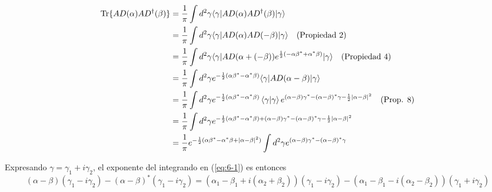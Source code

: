 \begin{enumerate}
        \begin{align}
          \mathrm{Tr}\{ A{D}(\alpha)A{D}^{\dagger}(\beta) \} & = \frac{1}{\pi} \int d^2 \gamma \langle  \gamma \vert A{D}(\alpha) A{D}^{\dagger}(\beta) \vert \gamma \rangle \nonumber                                                                                             \\
                                                                   & = \frac{1}{\pi} \int d^2 \gamma \langle \gamma \vert A{D}(\alpha) A{D}(-\beta) \vert \gamma\rangle \quad (\text{Propiedad 2})\nonumber                                                                              \\
                                                                   & = \frac{1}{\pi} \int d^2 \gamma \langle \gamma \vert A{D}(\alpha + (-\beta))e^{\frac{1}{2}(-\alpha \beta^{*} + \alpha^{*} \beta)} \vert \gamma \rangle \quad (\text{Propiedad 4})\nonumber                             \\
                                                                   & = \frac{1}{\pi} \int d^2 \gamma e^{-\frac{1}{2}(\alpha \beta^* - \alpha^* \beta)} \langle \gamma \vert A{D}(\alpha-\beta)\vert \gamma\rangle  \nonumber                                                                \\
                                                                   & = \frac{1}{\pi} \int d^2 \gamma e^{-\frac{1}{2}(\alpha \beta^* - \alpha^* \beta)} \braket{\gamma}{\gamma} e^{(\alpha-\beta)\gamma^* - (\alpha-\beta)^* \gamma -\frac{1}{2}|\alpha-\beta|^2}\quad\text{(Prop. 8)}\nonumber \\
                                                                   & = \frac{1}{\pi} \int d^2 \gamma e^{ -\frac{1}{2}(\alpha \beta^* - \alpha^* \beta) + (\alpha-\beta)\gamma^* - (\alpha-\beta)^* \gamma -\frac{1}{2}|\alpha-\beta|^2} \nonumber                                              \\
                                                                   & = \frac{1}{\pi} e^{-\frac{1}{2}(\alpha\beta^* - \alpha^*\beta + |\alpha-\beta|^2)} \int d^2 \gamma e^{ (\alpha-\beta)\gamma^* - (\alpha-\beta)^* \gamma } \label{eq:6-1}
        \end{align}

        Expresando $\gamma=\gamma_1 + i \gamma_2$, el exponente del integrando en (\ref{eq:6-1}) es entonces
        \begin{equation*}
          (\alpha-\beta)(\gamma_1 - i\gamma_2) - (\alpha-\beta)^*(\gamma_1 - i\gamma_2) = (\alpha_1-\beta_1 + i(\alpha_2 + \beta_2))(\gamma_1 - i\gamma_2) - (\alpha_1-\beta_1 - i(\alpha_2-\beta_2))(\gamma_1+i\gamma_2)
        \end{equation*}


\end{enumerate}
